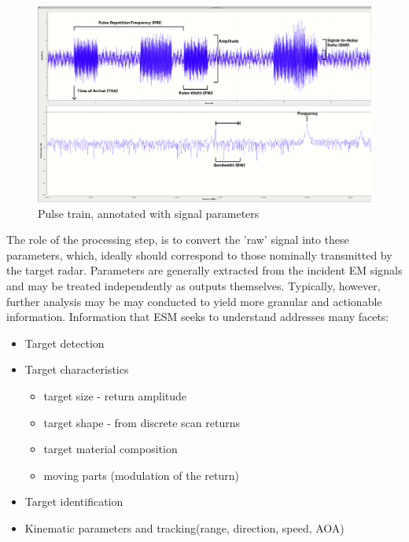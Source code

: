 \begin{figure}[t]
    \centering
    \includegraphics[width=1\textwidth]{Figures/annotated.png}
    \caption{Pulse train, annotated with signal parameters}
    \label{fig:pulse_train}
\end{figure}

The role of the processing step, is to convert the 'raw' signal into these parameters, which, ideally should correspond to those nominally transmitted by the target radar.
Parameters are generally extracted from the incident \ac{EM} signals and may be treated independently as outputs themselves. Typically, however, further analysis may be may conducted to yield more granular and actionable information. Information that \ac{ESM} seeks to understand addresses many facets:
\begin{itemize}
    \item Target detection
    \item Target characteristics \cite{jenn_radar_2007}
    \begin{itemize}
        \item target size - return amplitude
        \item target shape - from discrete scan returns
        \item target material composition
        \item moving parts (modulation of the return)
    \end{itemize}
    \item Target identification
    \item Kinematic parameters and tracking(range, direction, speed, \ac{AOA})
\end{itemize}

